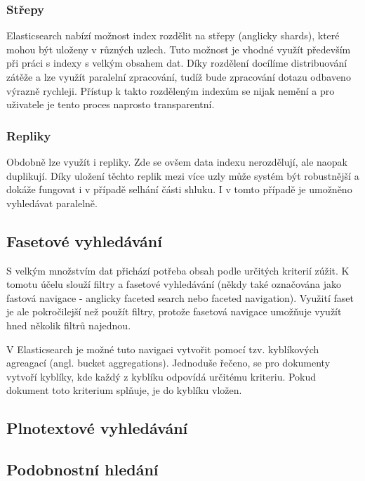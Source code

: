 \subsubsection*{Střepy}
Elasticsearch nabízí možnost index rozdělit na střepy (anglicky shards), které mohou být uloženy v různých uzlech. Tuto možnost je vhodné využít především při práci s indexy s velkým obsahem dat. Díky rozdělení docílíme distribuování zátěže a lze využít paralelní zpracování, tudíž bude zpracování dotazu odbaveno výrazně rychleji. 
Přístup k takto rozděleným indexům se nijak nemění a pro uživatele je tento proces naprosto transparentní.

\subsubsection*{Repliky}
Obdobně lze využít i repliky. Zde se ovšem data indexu nerozdělují, ale naopak duplikují. Díky uložení těchto replik mezi více uzly může systém být robustnější a dokáže fungovat i v případě selhání části shluku. I v tomto případě je umožněno vyhledávat paralelně. 

\subsection{Fasetové vyhledávání}
S velkým množstvím dat přichází potřeba obsah podle určitých kriterií zúžit. K tomotu účelu slouží filtry a fasetové vyhledávání (někdy také označována jako fastová navigace - anglicky faceted search nebo faceted navigation). Využití faset je ale pokročilejší než použít filtry, protože fasetová navigace umožňuje využít hned několik filtrů najednou. %

V Elasticsearch je možné tuto navigaci vytvořit pomocí tzv. kyblíkových agreagací (angl. bucket aggregations).
Jednoduše řečeno, se pro dokumenty vytvoří kyblíky, kde každý z kyblíku odpovídá určitému kriteriu. Pokud dokument toto kriterium splňuje, je do kyblíku vložen.

\subsection{Plnotextové vyhledávání}
\blindtext[2]

\subsection{Podobnostní hledání}
\blindtext[2]


